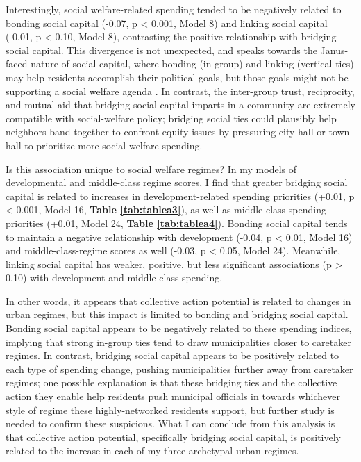 \documentclass[preprint, 3p,
authoryear]{elsarticle} %
\begin{document}
Interestingly, social welfare-related spending tended to be negatively
related to bonding social capital (-0.07, p \textless{} 0.001, Model 8)
and linking social capital (-0.01, p \textless{} 0.10, Model 8),
contrasting the positive relationship with bridging social capital. This
divergence is not unexpected, and speaks towards the Janus-faced nature
of social capital, where bonding (in-group) and linking (vertical ties)
may help residents accomplish their political goals, but those goals
might not be supporting a social welfare agenda \citep{aldrich_2012}. In
contrast, the inter-group trust, reciprocity, and mutual aid that
bridging social capital imparts in a community are extremely compatible
with social-welfare policy; bridging social ties could plausibly help
neighbors band together to confront equity issues by pressuring city
hall or town hall to prioritize more social welfare spending.

Is this association unique to social welfare regimes? In my models of
developmental and middle-class regime scores, I find that greater
bridging social capital is related to increases in development-related
spending priorities (+0.01, p \textless{} 0.001, Model 16,
\textbf{Table \ref{tab:tablea3}}), as well as middle-class spending
priorities (+0.01, Model 24, \textbf{Table \ref{tab:tablea4}}). Bonding
social capital tends to maintain a negative relationship with
development (-0.04, p \textless{} 0.01, Model 16) and
middle-class-regime scores as well (-0.03, p \textless{} 0.05, Model
24). Meanwhile, linking social capital has weaker, positive, but less
significant associations (p \textgreater{} 0.10) with development and
middle-class spending.

In other words, it appears that collective action potential is related
to changes in urban regimes, but this impact is limited to bonding and
bridging social capital. Bonding social capital appears to be negatively
related to these spending indices, implying that strong in-group ties
tend to draw municipalities closer to caretaker regimes. In contrast,
bridging social capital appears to be positively related to each type of
spending change, pushing municipalities further away from caretaker
regimes; one possible explanation is that these bridging ties and the
collective action they enable help residents push municipal officials in
towards whichever style of regime these highly-networked residents
support, but further study is needed to confirm these suspicions. What I
can conclude from this analysis is that collective action potential,
specifically bridging social capital, is positively related to the
increase in each of my three archetypal urban regimes.
\end{document}
